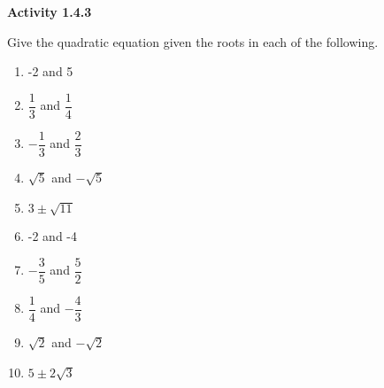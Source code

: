 \noindent\textbf{Activity 1.4.3}

\vspace{0.75ex}

Give the quadratic equation given the roots in each of the following.
   
\begin{multicols}{2}
\begin{enumerate}[label = \color{blue}\arabic*. ]
   \item -2 and 5
   \item $ \dfrac{1}{3} $ and $ \dfrac{1}{4} $
   \item $ -\dfrac{1}{3} $ and $ \dfrac{2}{3} $
   \item $ \sqrt{5} $ and $ -\sqrt{5} $
   \item $ 3 \pm \sqrt{11} $
   \item -2 and -4
   \item $ -\dfrac{3}{5} $ and $ \dfrac{5}{2} $
   \item $ \dfrac{1}{4} $ and $ -\dfrac{4}{3} $
   \item $ \sqrt{2} $ and $ -\sqrt{2} $
   \item $ 5 \pm 2\sqrt{3} $   
\end{enumerate}
\end{multicols} 